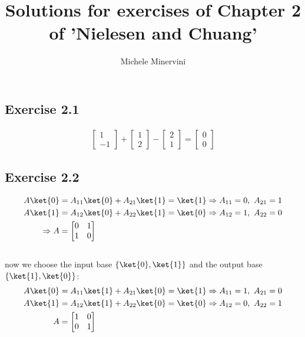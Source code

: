 \documentclass[a4paper,12pt]{article}
\title{Solutions for exercises of Chapter 2\\of 'Nielesen and Chuang'}
\author{Michele Minervini}
\date{}
\begin{document}
\pagestyle{fancy}
\fancyhead{} %
\fancyfoot{} %
\fancyfoot[C]{\thepage}


\maketitle

\subsection*{Exercise 2.1}
\begin{align*}
	\begin{bmatrix}
		1 \\
		-1
	\end{bmatrix}
	+
	\begin{bmatrix}
		1 \\
		2
	\end{bmatrix}
	-
	\begin{bmatrix}
		2 \\
		1
	\end{bmatrix}
	=
	\begin{bmatrix}
		0 \\
		0
	\end{bmatrix}
\end{align*}

\subsection*{Exercise 2.2}
\begin{align*}
	A\ket{0} &= A_{11}\ket{0} + A_{21}\ket{1} = \ket{1} \Rightarrow A_{11} = 0,\ A_{21} = 1\\
	A\ket{1} &= A_{12}\ket{0} + A_{22}\ket{1} = \ket{0} \Rightarrow A_{12} = 1,\ A_{22} = 0\\
%
    \Rightarrow A &=
	\begin{bmatrix}
		0 & 1 \\
		1 & 0
	\end{bmatrix}
\end{align*}\\
now we choose the input base $\left\{\ket{0}, \ket{1}\right\}$ and the output base $\left\{\ket{1}, \ket{0}\right\}$:
\begin{align*}
	A\ket{0}&= A_{11}\ket{1} + A_{21}\ket{0} = \ket{1} \Rightarrow A_{11} = 1,\ A_{21} = 0\\
%
	A\ket{1} &= A_{12}\ket{1} + A_{22}\ket{0} = \ket{0} \Rightarrow A_{12} = 0,\ A_{22} = 1\\
%
	A &=
	\begin{bmatrix}
	1 & 0 \\
	0 & 1
	\end{bmatrix}
\end{align*}
\end{document}
